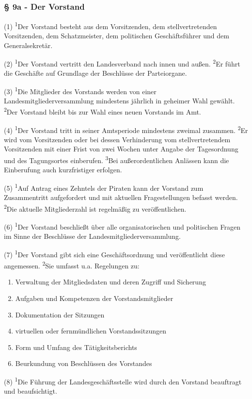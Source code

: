 \subsubsection{§ 9a - Der Vorstand}

(1) \textsuperscript{1}Der Vorstand besteht aus dem Vorsitzenden, dem
stellvertretenden Vorsitzenden, dem Schatzmeister, dem politischen
Geschäftsführer und dem Generalsekretär.

(2) \textsuperscript{1}Der Vorstand vertritt den Landesverband nach
innen und außen. \textsuperscript{2}Er führt die Geschäfte auf Grundlage
der Beschlüsse der Parteiorgane.

(3) \textsuperscript{1}Die Mitglieder des Vorstands werden von einer
Landesmitgliederversammlung mindestens jährlich in geheimer Wahl
gewählt. \textsuperscript{2}Der Vorstand bleibt bis zur Wahl eines neuen
Vorstands im Amt.

(4) \textsuperscript{1}Der Vorstand tritt in seiner Amtsperiode
mindestens zweimal zusammen. \textsuperscript{2}Er wird vom Vorsitzenden
oder bei dessen Verhinderung vom stellvertretendem Vorsitzenden mit
einer Frist von zwei Wochen unter Angabe der Tagesordnung und des
Tagungsortes einberufen. \textsuperscript{3}Bei außerordentlichen
Anlässen kann die Einberufung auch kurzfristiger erfolgen.

(5) \textsuperscript{1}Auf Antrag eines Zehntels der Piraten kann der
Vorstand zum Zusammentritt aufgefordert und mit aktuellen
Fragestellungen befasst werden. \textsuperscript{2}Die aktuelle
Mitgliederzahl ist regelmäßig zu veröffentlichen.

(6) \textsuperscript{1}Der Vorstand beschließt über alle
organisatorischen und politischen Fragen im Sinne der Beschlüsse der
Landesmitgliederversammlung.

(7) \textsuperscript{1}Der Vorstand gibt sich eine Geschäftsordnung und
veröffentlicht diese angemessen. \textsuperscript{2}Sie umfasst u.a.
Regelungen zu:

\begin{enumerate}
\item
  Verwaltung der Mitgliedsdaten und deren Zugriff und Sicherung
\item
  Aufgaben und Kompetenzen der Vorstandsmitglieder
\item
  Dokumentation der Sitzungen
\item
  virtuellen oder fernmündlichen Vorstandssitzungen
\item
  Form und Umfang des Tätigkeitsberichts
\item
  Beurkundung von Beschlüssen des Vorstandes
\end{enumerate}
(8) \textsuperscript{1}Die Führung der Landesgeschäftsstelle wird durch
den Vorstand beauftragt und beaufsichtigt.

